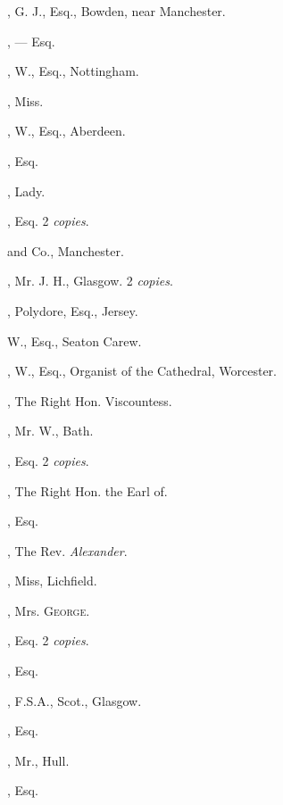  

\begin{multicols}{2}\small
\setlength{\parindent}{0em}
\setlength{\parskip}{0em}
\raggedright

, G. J., Esq., Bowden, near Manchester.

, — Esq.

, W., Esq., Nottingham.
\bigskip

, Miss.

, W., Esq., Aberdeen.

, Esq.

, Lady.

, Esq. 2 \textit{copies}.

 and Co., Manchester.

, Mr. J. H., Glasgow. 2 \textit{copies}.

, Polydore, Esq., Jersey.

 W., Esq., Seaton Carew.

, W., Esq., Organist of the Cathedral,
Worcester.

, The Right Hon. Viscountess.

, Mr. W., Bath.

, Esq. 2 \textit{copies}.

, The Right Hon. the Earl of.

, Esq.

, The Rev. \textit{Alexander}.
\bigskip

, Miss, Lichfield.

, Mrs. \textsc{George}.

, Esq. 2 \textit{copies}.

, Esq.

, F.S.A., Scot., Glasgow.
\bigskip

, Esq.

, Mr., Hull.

, Esq.


\end{multicols}
